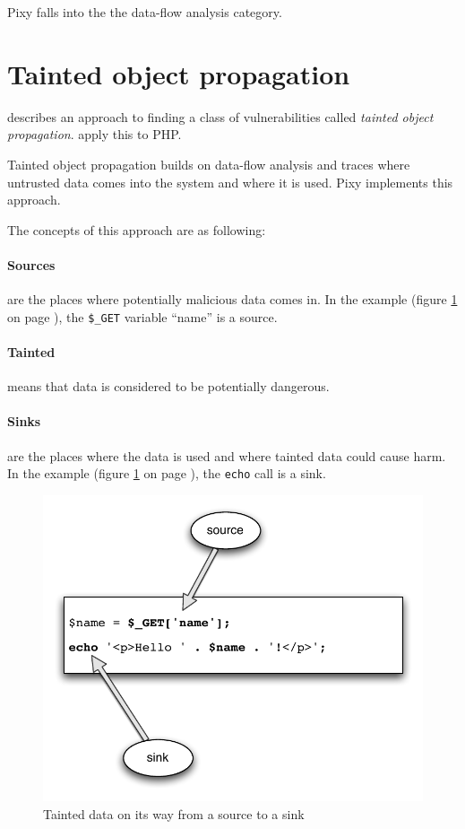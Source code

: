 Pixy falls into the the data-flow analysis category.

\section{Tainted object propagation}
\label{tainting}
\cite{finding-security-vulnerabilities} describes an approach to finding a class of vulnerabilities called \emph{tainted object propagation}. \cite{pixy-short, pixy-long, pixy-dissertation} apply this to PHP.

Tainted object propagation builds on data-flow analysis and traces where untrusted data comes into the system and where it is used. Pixy implements this approach.

The concepts of this approach are as following:
\paragraph{Sources} are the places where potentially malicious data comes in. In the example (figure \ref{fig:taint} on page \pageref{fig:taint}), the \texttt{\$\_GET} variable ``name'' is a source.
\paragraph{Tainted} means that data is considered to be potentially dangerous.
\paragraph{Sinks} are the places where the data is used and where tainted data could cause harm. In the example (figure \ref{fig:taint} on page \pageref{fig:taint}), the \texttt{echo} call is a sink.

\begin{figure}[!h]
  \includegraphics[scale=0.8]{images/taint}
  \caption{Tainted data on its way from a source to a sink}
  \label{fig:taint}
\end{figure}

